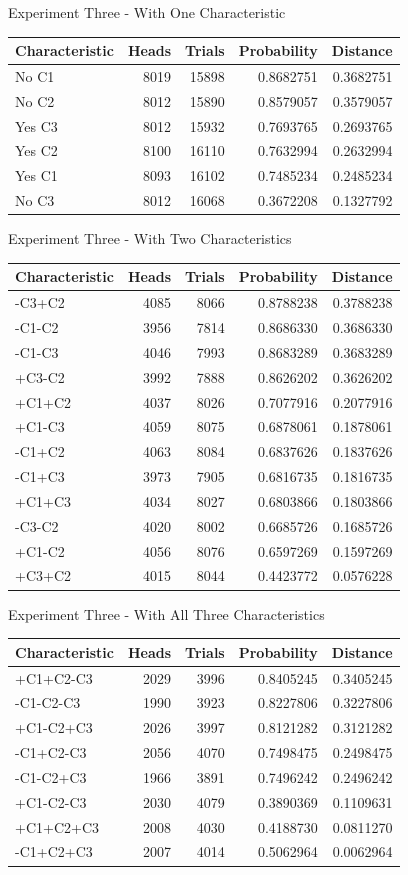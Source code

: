 \documentclass[
  ignorenonframetext,
]{beamer}
\renewcommand{\,}{\text{, }}
\begin{document}
\begin{frame}{Experiment Three - With One Characteristic}
\protect\hypertarget{experiment-three---with-one-characteristic}{}

\begin{longtable}[]{@{}lrrrr@{}}
\toprule
Characteristic & Heads & Trials & Probability & Distance\tabularnewline
\midrule
\endhead
No C1 & 8019 & 15898 & 0.8682751 & 0.3682751\tabularnewline
No C2 & 8012 & 15890 & 0.8579057 & 0.3579057\tabularnewline
Yes C3 & 8012 & 15932 & 0.7693765 & 0.2693765\tabularnewline
Yes C2 & 8100 & 16110 & 0.7632994 & 0.2632994\tabularnewline
Yes C1 & 8093 & 16102 & 0.7485234 & 0.2485234\tabularnewline
No C3 & 8012 & 16068 & 0.3672208 & 0.1327792\tabularnewline
\bottomrule
\end{longtable}

\end{frame}

\begin{frame}{Experiment Three - With Two Characteristics}
\protect\hypertarget{experiment-three---with-two-characteristics}{}

\begin{longtable}[]{@{}lrrrr@{}}
\toprule
Characteristic & Heads & Trials & Probability & Distance\tabularnewline
\midrule
\endhead
-C3+C2 & 4085 & 8066 & 0.8788238 & 0.3788238\tabularnewline
-C1-C2 & 3956 & 7814 & 0.8686330 & 0.3686330\tabularnewline
-C1-C3 & 4046 & 7993 & 0.8683289 & 0.3683289\tabularnewline
+C3-C2 & 3992 & 7888 & 0.8626202 & 0.3626202\tabularnewline
+C1+C2 & 4037 & 8026 & 0.7077916 & 0.2077916\tabularnewline
+C1-C3 & 4059 & 8075 & 0.6878061 & 0.1878061\tabularnewline
-C1+C2 & 4063 & 8084 & 0.6837626 & 0.1837626\tabularnewline
-C1+C3 & 3973 & 7905 & 0.6816735 & 0.1816735\tabularnewline
+C1+C3 & 4034 & 8027 & 0.6803866 & 0.1803866\tabularnewline
-C3-C2 & 4020 & 8002 & 0.6685726 & 0.1685726\tabularnewline
+C1-C2 & 4056 & 8076 & 0.6597269 & 0.1597269\tabularnewline
+C3+C2 & 4015 & 8044 & 0.4423772 & 0.0576228\tabularnewline
\bottomrule
\end{longtable}

\end{frame}

\begin{frame}{Experiment Three - With All Three Characteristics}
\protect\hypertarget{experiment-three---with-all-three-characteristics}{}

\begin{longtable}[]{@{}lrrrr@{}}
\toprule
Characteristic & Heads & Trials & Probability & Distance\tabularnewline
\midrule
\endhead
+C1+C2-C3 & 2029 & 3996 & 0.8405245 & 0.3405245\tabularnewline
-C1-C2-C3 & 1990 & 3923 & 0.8227806 & 0.3227806\tabularnewline
+C1-C2+C3 & 2026 & 3997 & 0.8121282 & 0.3121282\tabularnewline
-C1+C2-C3 & 2056 & 4070 & 0.7498475 & 0.2498475\tabularnewline
-C1-C2+C3 & 1966 & 3891 & 0.7496242 & 0.2496242\tabularnewline
+C1-C2-C3 & 2030 & 4079 & 0.3890369 & 0.1109631\tabularnewline
+C1+C2+C3 & 2008 & 4030 & 0.4188730 & 0.0811270\tabularnewline
-C1+C2+C3 & 2007 & 4014 & 0.5062964 & 0.0062964\tabularnewline
\bottomrule
\end{longtable}

\end{frame}
\end{document}
